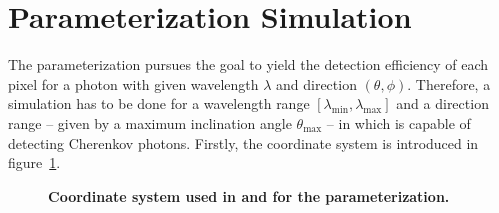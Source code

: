 \section{Parameterization Simulation}

The parameterization pursues the goal to yield the detection efficiency of each pixel for a photon with given wavelength $\lambda$ and direction $(\theta,\phi)$. Therefore, a simulation has to be done for a wavelength range $[\lambda_\text{min}, \lambda_\text{max}]$ and a direction range -- given by a maximum inclination angle $\theta_\text{max}$ -- in which \iceact is capable of detecting Cherenkov photons. Firstly, the \geant coordinate system is introduced in figure~\ref{geant_coords}.\\

\begin{figure}[H]
	\centering
	\begin{subfigure}[t]{0.49\textwidth}
	\end{subfigure}
	\hfill
	\begin{subfigure}[t]{0.49\textwidth}
		\usebox{\savedimage}
	\end{subfigure}
	\caption[Coordinate system used in \geant and for the parameterization]{\textbf{Coordinate system used in \geant and for the parameterization.} }
	\label{geant_coords}
\end{figure}
\newpage

